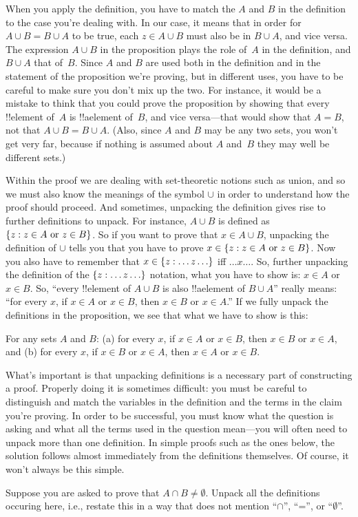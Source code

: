 \documentclass[../../../include/open-logic-section]{subfiles}
\begin{document}
When you apply the definition, you have to match the $A$ and $B$ in
the definition to the case you're dealing with.  In our case, it means
that in order for $A \cup B = B \cup A$ to be true, each $z \in A \cup
B$ must also be in $B \cup A$, and vice versa.  The expression $A \cup
B$ in the proposition plays the role of~$A$ in the definition, and $B
\cup A$ that of~$B$. Since $A$ and $B$ are used both in the definition
and in the statement of the proposition we're proving, but in
different uses, you have to be careful to make sure you don't mix up
the two.  For instance, it would be a mistake to think that you could
prove the proposition by showing that every !!{element} of~$A$ is
!!a{element} of~$B$, and vice versa---that would show that $A = B$,
not that $A \cup B = B \cup A$. (Also, since $A$ and $B$ may be any
two sets, you won't get very far, because if nothing is assumed about
$A$ and~$B$ they may well be different sets.)

Within the proof we are dealing with set-theoretic notions such as
union, and so we must also know the meanings of the symbol $\cup$ in
order to understand how the proof should proceed. And sometimes,
unpacking the definition gives rise to further definitions to
unpack. For instance, $A \cup B$ is defined as $\{ z : z \in A
  \text{ or } z \in B \}$. So if you want to prove that $x \in A \cup
B$, unpacking the definition of $\cup$ tells you that you have to
prove $x \in \{ z : z \in A \text{ or } z \in B \}$.  Now you also
have to remember that $x \in \Setabs{z}{\dots z\dots}$ iff $\dots
x\dots$.  So, further unpacking the definition of the
$\Setabs{z}{\dots z \dots}$ notation, what you have to show is: $x \in
A$ or $x \in B$. So, ``every !!{element} of $A \cup B$ is also
!!a{element} of $B \cup A$'' really means: ``for every $x$, if $x \in
A$ or $x \in B$, then $x \in B$ or $x \in A$.''  If we fully
unpack the definitions in the proposition, we see that what we have to
show is this:

\begin{prop}
For any sets $A$ and $B$: (a) for every $x$, if $x \in A$ or $x \in
B$, then $x \in B$ or $x \in A$, and (b) for every $x$, if $x \in B$
or $x \in A$, then $x \in A$ or $x \in B$.
\end{prop}

What's important is that unpacking definitions is a necessary part of
constructing a proof. Properly doing it is sometimes difficult: you
must be careful to distinguish and match the variables in the
definition and the terms in the claim you're proving.  In order to be
successful, you must know what the question is asking and what all the
terms used in the question mean---you will often need to unpack more
than one definition.  In simple proofs such as the ones below, the
solution follows almost immediately from the definitions
themselves. Of course, it won't always be this simple.

\begin{prob}
Suppose you are asked to prove that $A \cap B \neq \emptyset$. Unpack
all the definitions occuring here, i.e., restate this in a way that
does not mention ``$\cap$'', ``='', or ``$\emptyset$''.
\end{prob}
\end{document}
